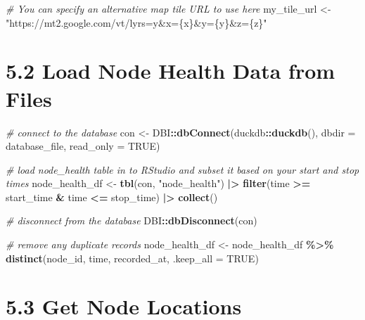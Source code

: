 \documentclass[
]{book}
\newenvironment{Shaded}{\begin{snugshade}}{\end{snugshade}}
\newcommand{\AttributeTok}[1]{\textcolor[rgb]{0.13,0.29,0.53}{#1}}
\newcommand{\CommentTok}[1]{\textcolor[rgb]{0.56,0.35,0.01}{\textit{#1}}}
\newcommand{\ConstantTok}[1]{\textcolor[rgb]{0.56,0.35,0.01}{#1}}
\newcommand{\FunctionTok}[1]{\textcolor[rgb]{0.13,0.29,0.53}{\textbf{#1}}}
\newcommand{\NormalTok}[1]{#1}
\newcommand{\OtherTok}[1]{\textcolor[rgb]{0.56,0.35,0.01}{#1}}
\newcommand{\SpecialCharTok}[1]{\textcolor[rgb]{0.81,0.36,0.00}{\textbf{#1}}}
\newcommand{\StringTok}[1]{\textcolor[rgb]{0.31,0.60,0.02}{#1}}
\begin{document}
\begin{Shaded}
\begin{Highlighting}[]
\CommentTok{\# You can specify an alternative map tile URL to use here}
\NormalTok{my\_tile\_url }\OtherTok{\textless{}{-}} \StringTok{"https://mt2.google.com/vt/lyrs=y\&x=\{x\}\&y=\{y\}\&z=\{z\}"}
\end{Highlighting}
\end{Shaded}

\section{5.2 Load Node Health Data from Files}\label{load-node-health-data-from-files}

\begin{Shaded}
\begin{Highlighting}[]
\CommentTok{\# connect to the database}
\NormalTok{con }\OtherTok{\textless{}{-}}\NormalTok{ DBI}\SpecialCharTok{::}\FunctionTok{dbConnect}\NormalTok{(duckdb}\SpecialCharTok{::}\FunctionTok{duckdb}\NormalTok{(), }
                      \AttributeTok{dbdir =}\NormalTok{ database\_file, }
                      \AttributeTok{read\_only =} \ConstantTok{TRUE}\NormalTok{)}

\CommentTok{\# load node\_health table in to RStudio and subset it based on your start and stop times}
\NormalTok{node\_health\_df }\OtherTok{\textless{}{-}} \FunctionTok{tbl}\NormalTok{(con, }\StringTok{"node\_health"}\NormalTok{) }\SpecialCharTok{|\textgreater{}} 
  \FunctionTok{filter}\NormalTok{(time }\SpecialCharTok{\textgreater{}=}\NormalTok{ start\_time }\SpecialCharTok{\&}\NormalTok{ time }\SpecialCharTok{\textless{}=}\NormalTok{ stop\_time) }\SpecialCharTok{|\textgreater{}}
  \FunctionTok{collect}\NormalTok{()}

\CommentTok{\# disconnect from the database}
\NormalTok{DBI}\SpecialCharTok{::}\FunctionTok{dbDisconnect}\NormalTok{(con)}

\CommentTok{\# remove any duplicate records}
\NormalTok{node\_health\_df }\OtherTok{\textless{}{-}}\NormalTok{ node\_health\_df }\SpecialCharTok{\%\textgreater{}\%} 
  \FunctionTok{distinct}\NormalTok{(node\_id, }
\NormalTok{           time, }
\NormalTok{           recorded\_at, }
           \AttributeTok{.keep\_all =} \ConstantTok{TRUE}\NormalTok{)}
\end{Highlighting}
\end{Shaded}

\section{5.3 Get Node Locations}\label{get-node-locations}
\end{document}
